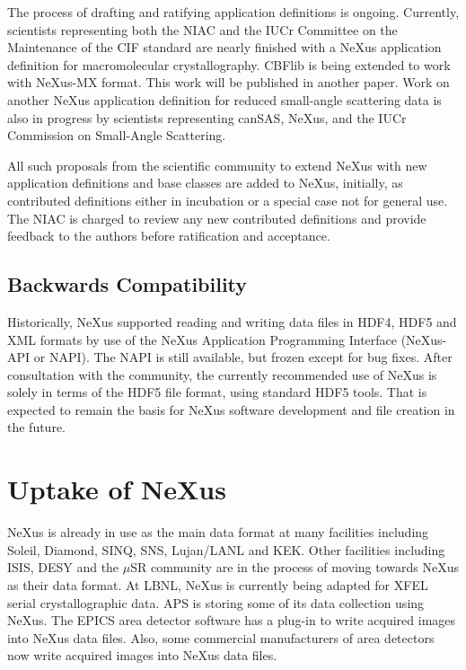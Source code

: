 \documentclass[%
 aip,
rsi,
 amsmath,amssymb,
 reprint,%
]{revtex4-1}
\begin{document}
The process of drafting and ratifying application definitions
is ongoing.
Currently, scientists representing both
the NIAC and the IUCr Committee on the Maintenance
of the CIF standard 
are nearly finished with a NeXus application definition for macromolecular crystallography.
CBFlib\cite{cbflib} is being extended to work with NeXus-MX format. This work will be published in another paper. 
Work on another NeXus application definition for reduced small-angle scattering data
is also in progress\cite{cansas}  by scientists representing
canSAS, NeXus, and the IUCr Commission on Small-Angle Scattering.

All such proposals from the scientific community to extend NeXus 
with new application definitions and base classes are added to 
NeXus, initially, as contributed definitions either in incubation 
or a special case not for general use. The NIAC is charged to 
review any new contributed definitions and provide feedback to the 
authors before ratification and acceptance.


\subsection{Backwards Compatibility}

Historically, NeXus supported reading and writing data files in HDF4, HDF5 and
XML formats by use of the NeXus Application Programming Interface
(NeXus-API or NAPI).  The NAPI is still available, but frozen except for bug fixes.
After consultation with the community, the currently recommended use of
NeXus is solely in terms of the HDF5 file format, using standard HDF5 tools.
That is expected to remain the basis for NeXus software development and
file creation in the future.


\section{Uptake of NeXus} 

NeXus is already in use as the main data format at many facilities including Soleil, Diamond, SINQ, SNS, Lujan/LANL 
and KEK. Other facilities including ISIS, DESY and the $\mu$SR community are in the process of moving towards 
NeXus as their data format. At LBNL, NeXus is currently being adapted for XFEL serial crystallographic data. 
APS is storing some of its data collection using NeXus.
The EPICS\cite{epicsad} area detector software has a plug-in to write acquired images into NeXus data files.
Also, some commercial manufacturers of area detectors now write acquired images into NeXus data files.
\end{document}
